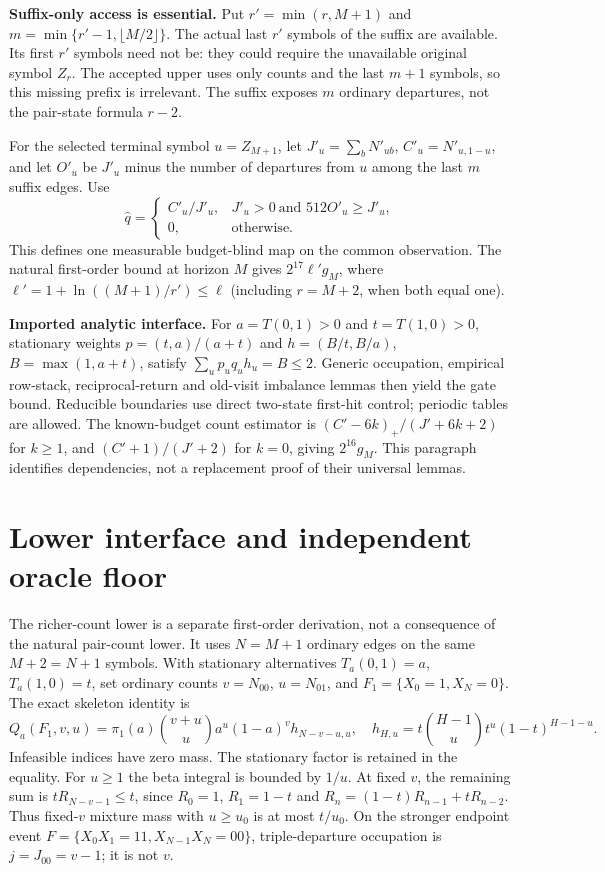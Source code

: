 \documentclass[10pt]{article}
\begin{document}
\textbf{Suffix-only access is essential.} Put $r'=\min(r,M+1)$ and
$m=\min\{r'-1,\lfloor M/2\rfloor\}$. The actual last $r'$ symbols of the suffix are available. Its first $r'$ symbols need not be: they could require the unavailable original symbol $Z_r$. The accepted upper uses only counts and the last $m+1$ symbols, so this missing prefix is irrelevant. The suffix exposes $m$ ordinary departures, not the pair-state formula $r-2$.

For the selected terminal symbol $u=Z_{M+1}$, let $J'_u=\sum_bN'_{ub}$, $C'_u=N'_{u,1-u}$, and let $O'_u$ be $J'_u$ minus the number of departures from $u$ among the last $m$ suffix edges. Use
\[
 \widehat q=\begin{cases}C'_u/J'_u,&J'_u>0\ \text{and }512O'_u\ge J'_u,\\0,&\text{otherwise.}\end{cases}
\]
This defines one measurable budget-blind map on the common observation. The natural first-order bound at horizon $M$ gives $2^{17}\ell'g_M$, where $\ell'=1+\ln((M+1)/r')\le\ell$ (including $r=M+2$, when both equal one).

\textbf{Imported analytic interface.} For $a=T(0,1)>0$ and $t=T(1,0)>0$, stationary weights $p=(t,a)/(a+t)$ and $h=(B/t,B/a)$, $B=\max(1,a+t)$, satisfy $\sum_up_uq_uh_u=B\le2$. Generic occupation, empirical row-stack, reciprocal-return and old-visit imbalance lemmas then yield the gate bound. Reducible boundaries use direct two-state first-hit control; periodic tables are allowed. The known-budget count estimator is $(C'-6k)_+/(J'+6k+2)$ for $k\ge1$, and $(C'+1)/(J'+2)$ for $k=0$, giving $2^{16}g_M$. This paragraph identifies dependencies, not a replacement proof of their universal lemmas.
\newpage
\section{Lower interface and independent oracle floor}
The richer-count lower is a separate first-order derivation, not a consequence of the natural pair-count lower. It uses $N=M+1$ ordinary edges on the same $M+2=N+1$ symbols. With stationary alternatives $T_a(0,1)=a$, $T_a(1,0)=t$, set ordinary counts $v=N_{00}$, $u=N_{01}$, and $F_1=\{X_0=1,X_N=0\}$. The exact skeleton identity is
\[
 Q_a(F_1,v,u)=\pi_1(a)\binom{v+u}{u}a^u(1-a)^v h_{N-v-u,u},
 \quad h_{H,u}=t\binom{H-1}{u}t^u(1-t)^{H-1-u}.
\]
Infeasible indices have zero mass. The stationary factor is retained in the equality. For $u\ge1$ the beta integral is bounded by $1/u$. At fixed $v$, the remaining sum is $tR_{N-v-1}\le t$, since $R_0=1$, $R_1=1-t$ and
$R_n=(1-t)R_{n-1}+tR_{n-2}$. Thus fixed-$v$ mixture mass with $u\ge u_0$ is at most $t/u_0$. On the stronger endpoint event $F=\{X_0X_1=11,X_{N-1}X_N=00\}$, triple-departure occupation is $j=J_{00}=v-1$; it is not $v$.
\end{document}
